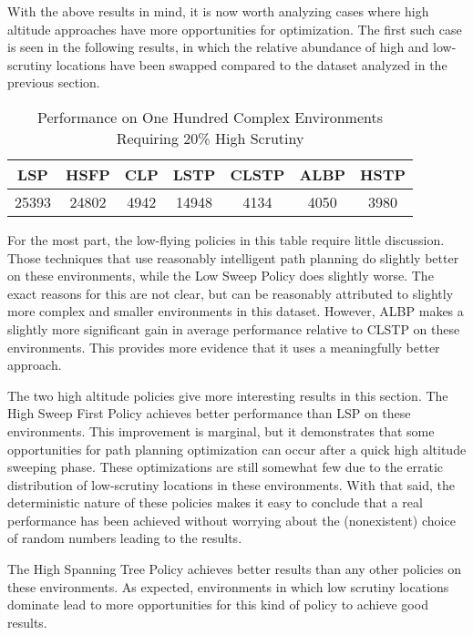 With the above results in mind, it is now worth analyzing cases where high altitude approaches have more opportunities for optimization. The first such case is seen in the following results, in which the relative abundance of high and low-scrutiny locations have been swapped compared to the dataset analyzed in the previous section.

\begin{table}[h]
\begin{center}
 \begin{tabular}{||c c c c c c c ||}
 \hline
 LSP   & HSFP  & CLP  & LSTP  & CLSTP & ALBP & HSTP \\
 \hline
 25393 & 24802 & 4942 & 14948 & 4134  & 4050 & 3980 \\
 \hline
 \end{tabular}
\end{center}
\caption{Performance on One Hundred Complex Environments Requiring 20\% High Scrutiny}
\end{table}

For the most part, the low-flying policies in this table require little discussion. Those techniques that use reasonably intelligent path planning do slightly better on these environments, while the Low Sweep Policy does slightly worse. The exact reasons for this are not clear, but can be reasonably attributed to slightly more complex and smaller environments in this dataset. However, ALBP makes a slightly more significant gain in average performance relative to CLSTP on these environments. This provides more evidence that it uses a meaningfully better approach.

The two high altitude policies give more interesting results in this section. The High Sweep First Policy achieves better performance than LSP on these environments. This improvement is marginal, but it demonstrates that some opportunities for path planning optimization can occur after a quick high altitude sweeping phase. These optimizations are still somewhat few due to the erratic distribution of low-scrutiny locations in these environments. With that said, the deterministic nature of these policies makes it easy to conclude that a real performance has been achieved without worrying about the (nonexistent) choice of random numbers leading to the results.

The High Spanning Tree Policy achieves better results than any other policies on these environments. As expected, environments in which low scrutiny locations dominate lead to more opportunities for this kind of policy to achieve good results.

